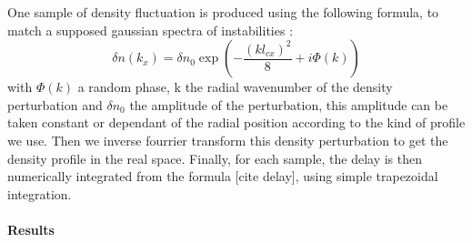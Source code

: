 \documentclass[11pt,a4paper,openany]{report}
\begin{document}
\begin{multicols}{2}
    One sample of density fluctuation is produced using the following formula, to match a supposed gaussian spectra of instabilities :
    $$\delta n(k_x) = \delta n_0 \exp\left(-\frac{(kl_{cx})^2}{8} + i\Phi(k)\right)$$
    with $\Phi(k)$ a random phase, k the radial wavenumber of the density perturbation and $\delta n_0$ the amplitude of the perturbation, this amplitude can be taken constant or dependant of the radial position according to the kind of profile we use. Then we inverse fourrier transform this density perturbation to get the density profile in the real space. Finally, for each sample, the delay is then numerically integrated from the formula [cite delay], using simple trapezoidal integration.
    \paragraph{Results}


\end{multicols}
\end{document}
